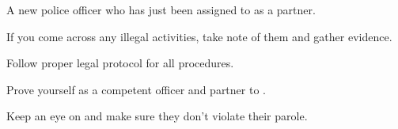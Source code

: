 \documentclass[char]{guildcamp4}
\begin{document}
\name{\cCgood{}}

\begin{itemz}[Backstory]
	\item A new police officer who has just been assigned to \cCbad{} as a partner.
\end{itemz}

\begin{itemz}[Goals]
	\item If you come across any illegal activities, take note of them and gather evidence.
	\item Follow proper legal protocol for all procedures.
	\item Prove yourself as a competent officer and partner to \cCbad{}.
	\item Keep an eye on \cPilot{} and make sure they don't violate their parole. 
\end{itemz}

\begin{itemz}[Notes]
	\item 
\end{itemz}

\begin{contacts}
	\contact{\cTest{}}
\end{contacts}
\end{document}
